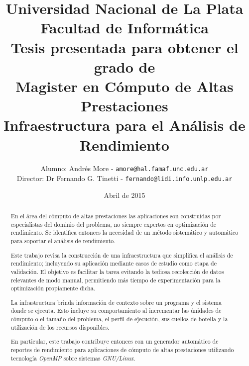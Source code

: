 \documentclass[a4paper]{report}
\begin{document}
\setlength{\parindent}{0cm}
\renewcommand{\tablename}{Tabla}

\title{Universidad Nacional de La Plata\\Facultad de Informática\\ \bigskip
{\large Tesis presentada para obtener el grado de \\}  Magister en Cómputo de Altas Prestaciones\\ \bigskip
  Infraestructura para el Análisis de Rendimiento}

\author{
  Alumno: Andrés More - {\tt amore@hal.famaf.unc.edu.ar}\\
  Director: Dr Fernando G. Tinetti - {\tt fernando@lidi.info.unlp.edu.ar}
}

\date{Abril de 2015}

\maketitle

\begin{abstract}

En el área del cómputo de altas prestaciones las aplicaciones son construidas por especialistas del dominio del problema, no siempre expertos en optimización de rendimiento. Se identifica entonces la necesidad de un método sistemático y automático para soportar el análisis de rendimiento.

\bigskip

Este trabajo revisa la construcción de una infraestructura que simplifica el análisis de rendimiento; incluyendo su aplicación mediante casos de estudio como etapa de validación. El objetivo es facilitar la tarea evitando la tediosa recolección de datos relevantes de modo manual, permitiendo más tiempo de experimentación para la optimización propiamente dicha.

\bigskip

La infrastructura brinda información de contexto sobre un programa y el sistema donde se ejecuta. Esto incluye su comportamiento al incrementar las únidades de cómputo o el tamaño del problema,
el perfil de ejecución, sus cuellos de botella y la utilización de los recursos disponibles.

\bigskip

En particular, este trabajo contribuye entonces con un generador automático de reportes de rendimiento para aplicaciones de cómputo de altas prestaciones utilizando tecnología {\it OpenMP} sobre sistemas {\it GNU/Linux}.

\end{abstract}
\end{document}
